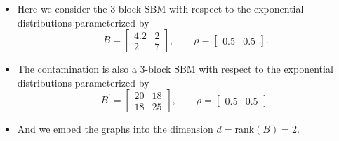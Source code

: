 \documentclass[a4paper]{article}
\begin{document}
\begin{itemize}
\item Here we consider the 3-block SBM with respect to the exponential distributions parameterized by
\begin{equation*}
B = \begin{bmatrix}
4.2 & 2 \\
2 & 7
\end{bmatrix}
,\qquad \rho = \begin{bmatrix}
0.5 & 0.5
\end{bmatrix}.
\end{equation*}
\item The contamination is also a 3-block SBM with respect to the exponential distributions parameterized by
\begin{equation*}
B^{\prime} = \begin{bmatrix}
20 & 18 \\
18 & 25
\end{bmatrix}
,\qquad \rho = \begin{bmatrix}
0.5 & 0.5
\end{bmatrix}.
\end{equation*}
\item And we embed the graphs into the dimension $d = \mathrm{rank}(B) = 2$.
\end{itemize}
\end{document}
